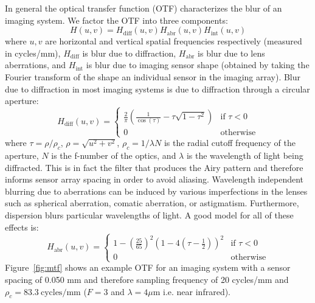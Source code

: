 In general the optical transfer function (OTF) characterizes the blur of an imaging system.
%
We factor the OTF into three components:
\begin{equation}
    H(u, v) = H_{\text{diff}}(u,v) H_{\text{abr}}(u,v) H_{\text{int}} (u,v)
\end{equation}
where $u,v$ are horizontal and vertical spatial frequencies respectively (measured in cycles/mm), $H_{\text{diff}}$ is blur due to diffraction, $H_{\text{abr}}$ is blur due to lens aberrations, and $H_{\text{int}}$ is blur due to imaging sensor shape (obtained by taking the Fourier transform of the shape an individual sensor in the imaging array).
%
Blur due to diffraction in most imaging systems is due to diffraction through a circular aperture\cite{goodman2005introduction}:
\begin{equation*}
    H_{\text{diff}}(u,v) =   \begin{cases}
                                 \frac{2}{\pi} \left(\frac{1}{\cos(\tau)} - \tau \sqrt{1-\tau^2}\right) & \text{if } \tau < 0 \\
                                 0 & \text{otherwise}
    \end{cases}
\end{equation*}
where $\tau = \rho/\rho_c$, $\rho=\sqrt{u^2 +v^2}$, $\rho_c = 1/\lambda N$ is the radial cutoff frequency of the aperture, $N$ is the f-number of the optics, and $\lambda$ is the wavelength of light being diffracted.
%
This is in fact the filter that produces the Airy pattern and therefore informs sensor array spacing in order to avoid aliasing.
%
Wavelength independent blurring due to aberrations can be induced by various imperfections in the lenses such as spherical aberration, comatic aberration, or astigmatism. Furthermore, dispersion blurs particular wavelengths of light. A good model for all of these effects is\cite{10.1117.12.946501}:
\begin{equation*}
    H_{\text{abr}}(u,v) =   \begin{cases}
                                1-\left(\frac{25}{65}\right)^2 \left(1-4\left(\tau - \frac{1}{2}\right)\right)^2& \text{if } \tau < 0 \\
                                0 & \text{otherwise}
    \end{cases}
\end{equation*}
Figure~\ref{fig:mtf} shows an example OTF for an imaging system with a sensor spacing of 0.050 mm and therefore sampling frequency of 20 cycles/mm and $\rho_c = 83.3~\text{cycles}/\text{mm}$ ($F=3$ and $\lambda = 4\mu\text{m}$ i.e. near infrared).
